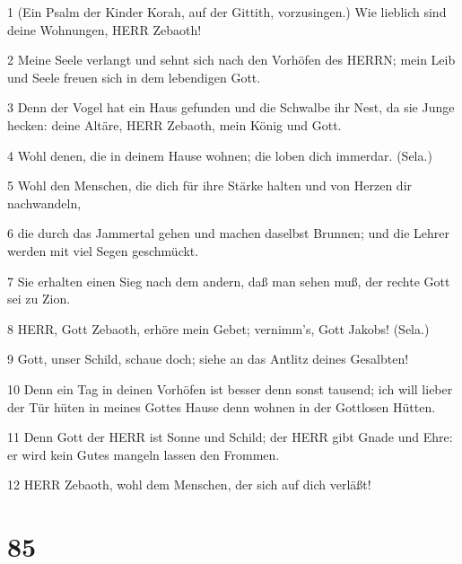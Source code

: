 \par 1 (Ein Psalm der Kinder Korah, auf der Gittith, vorzusingen.) Wie lieblich sind deine Wohnungen, HERR Zebaoth!
\par 2 Meine Seele verlangt und sehnt sich nach den Vorhöfen des HERRN; mein Leib und Seele freuen sich in dem lebendigen Gott.
\par 3 Denn der Vogel hat ein Haus gefunden und die Schwalbe ihr Nest, da sie Junge hecken: deine Altäre, HERR Zebaoth, mein König und Gott.
\par 4 Wohl denen, die in deinem Hause wohnen; die loben dich immerdar. (Sela.)
\par 5 Wohl den Menschen, die dich für ihre Stärke halten und von Herzen dir nachwandeln,
\par 6 die durch das Jammertal gehen und machen daselbst Brunnen; und die Lehrer werden mit viel Segen geschmückt.
\par 7 Sie erhalten einen Sieg nach dem andern, daß man sehen muß, der rechte Gott sei zu Zion.
\par 8 HERR, Gott Zebaoth, erhöre mein Gebet; vernimm's, Gott Jakobs! (Sela.)
\par 9 Gott, unser Schild, schaue doch; siehe an das Antlitz deines Gesalbten!
\par 10 Denn ein Tag in deinen Vorhöfen ist besser denn sonst tausend; ich will lieber der Tür hüten in meines Gottes Hause denn wohnen in der Gottlosen Hütten.
\par 11 Denn Gott der HERR ist Sonne und Schild; der HERR gibt Gnade und Ehre: er wird kein Gutes mangeln lassen den Frommen.
\par 12 HERR Zebaoth, wohl dem Menschen, der sich auf dich verläßt!

\chapter{85}

